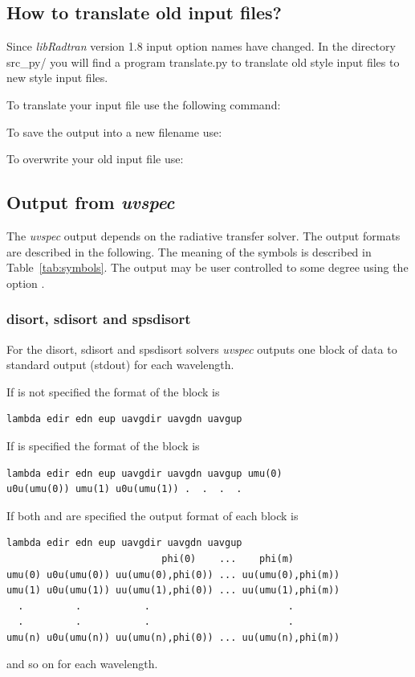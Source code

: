 \subsection{How to translate old input files?}
\label{sec:translate}

Since {\sl libRadtran} version 1.8 input option names have changed.
In the directory src\_py/ you will find a program translate.py 
to translate old style input files to new style input files.

To translate your input file use the following command:

To save the output into a new filename use:

To overwrite your old input file use:


\subsection{Output from {\sl uvspec}}
\label{sec:model_output}

The {\sl uvspec} output depends on the radiative transfer solver. The output
formats are described in the following. The meaning of the symbols is
described in Table~\ref{tab:symbols}. The output may be user
controlled to some degree using the option .

\subsubsection{disort, sdisort and spsdisort}
For the disort, sdisort and spsdisort solvers {\sl uvspec} outputs
one block of data to 
standard output (stdout) for each wavelength. 

If  is not specified the format of the block
is
\begin{Verbatim}[fontsize=\footnotesize, frame=single]  
lambda edir edn eup uavgdir uavgdn uavgup
\end{Verbatim}

If  is specified the format of the block is
\begin{Verbatim}[fontsize=\footnotesize, frame=single]  
lambda edir edn eup uavgdir uavgdn uavgup umu(0)
u0u(umu(0)) umu(1) u0u(umu(1)) .  .  .  .
\end{Verbatim}

If both  and  are specified the output
format of each block is
\begin{Verbatim}[fontsize=\footnotesize, frame=single, samepage=true]   
lambda edir edn eup uavgdir uavgdn uavgup 
                           phi(0)    ...    phi(m) 
umu(0) u0u(umu(0)) uu(umu(0),phi(0)) ... uu(umu(0),phi(m))
umu(1) u0u(umu(1)) uu(umu(1),phi(0)) ... uu(umu(1),phi(m)) 
  .         .           .                        .
  .         .           .                        .
umu(n) u0u(umu(n)) uu(umu(n),phi(0)) ... uu(umu(n),phi(m))
\end{Verbatim}
and so on for each wavelength.


